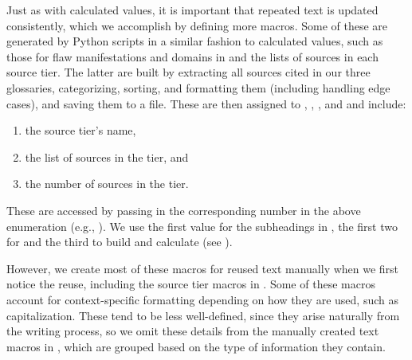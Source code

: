 \label{text-macros}
Just as with calculated values, it is important that repeated text is updated
consistently, which we accomplish by defining more macros. Some of these are
generated by Python scripts in a similar fashion to calculated values, such as
those for flaw manifestations and domains in  and the
lists of sources in each source tier. The latter are built by extracting all
sources cited in our three glossaries, categorizing, sorting, and formatting
them (including handling edge cases), and saving them to a file. These are then
assigned to , , , and
 and include:
\begin{enumerate}
    \item the source tier's name,
    \item the list of sources in the tier, and
    \item the number of sources in the tier.
\end{enumerate}
These are accessed by passing in the corresponding number in the above
enumeration (e.g., ). We use the first value for the
subheadings in , the first two for  and
the third to build  and calculate 
(see ).

However, we create most of these macros for reused text manually when we first
notice the reuse, including the source tier macros in .
Some of these macros account for context-specific formatting depending on how
they are used, such as capitalization. These tend to be less well-defined,
since they arise naturally from the writing process, so we omit these details
from the manually created text macros in , which are
grouped based on the type of information they contain.

\begin{landscape}
    
\end{landscape}

